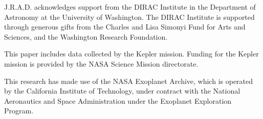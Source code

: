 \documentclass[twocolumn]{aastex62}
\begin{document}
J.R.A.D. acknowledges support from the DIRAC Institute in the Department of Astronomy at the University of Washington. The DIRAC Institute is supported through generous gifts from the Charles and Lisa Simonyi Fund for Arts and Sciences, and the Washington Research Foundation.

This paper includes data collected by the Kepler mission. Funding for the Kepler mission is provided by the NASA Science Mission directorate.

This research has made use of the NASA Exoplanet Archive, which is operated by the California Institute of Technology, under contract with the National Aeronautics and Space Administration under the Exoplanet Exploration Program.



\end{document}
